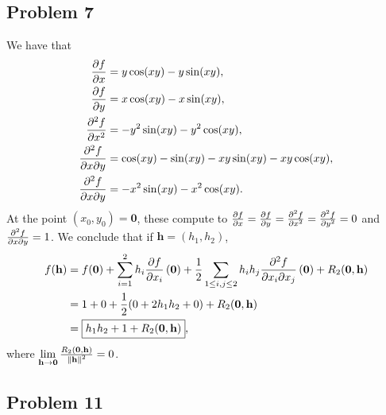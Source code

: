 \documentclass[11pt]{article}
\renewcommand{\vec}[1]{\mathbf{#1}}
\begin{document}

\subsection{Problem 7}

We have that
\begin{align*}
	\pdv{f}{x} &= y \cos(xy) - y \sin(xy), \\
	\pdv{f}{y} &= x \cos(xy) - x \sin(xy), \\
	\pdv[2]{f}{x} &= - y^{2} \sin(xy) - y^{2} \cos(xy), \\
	\pdv[2]{f}{x}{y} &= \cos(xy) - \sin(xy) - xy \sin(xy) - xy \cos(xy), \\ 
	\pdv[2]{f}{x}{y} &= -x^{2} \sin(xy) - x^{2} \cos(xy).
\end{align*}
At the point $(x_{0}, y_{0}) = \vec{0}$, these compute to $\pdv{f}{x} = \pdv{f}{y} = \pdv[2]{f}{x} = \pdv[2]{f}{y} = 0$ and $\pdv[2]{f}{x}{y} = 1$. We conclude that if $\vec{h} = (h_{1}, h_{2})$,
\begin{align*}
	f(\vec{h}) &= f(\vec{0}) + \sum_{i = 1}^{2} h_{i} \pdv{f}{x_{i}} \left( \vec{0} \right) + \frac{1}{2} \sum_{1 \le i, j \le 2} h_{i} h_{j} \pdv[2]{f}{x_{i}}{x_{j}} \left( \vec{0} \right) + R_{2}(\vec{0}, \vec{h}) \\
	&= 1 + 0 + \frac{1}{2}(0 + 2h_{1}h_{2} + 0) + R_{2}(\vec{0}, \vec{h}) \\
	&= \boxed{h_{1}h_{2} + 1 + R_{2}(\vec{0, \vec{h}})},
\end{align*}
where $\lim\limits_{\vec{h} \to \vec{0}} \frac{R_{2}(\vec{0}, \vec{h})}{\norm{\vec{h}}^{2}} = 0$.


\subsection{Problem 11}
\end{document}
